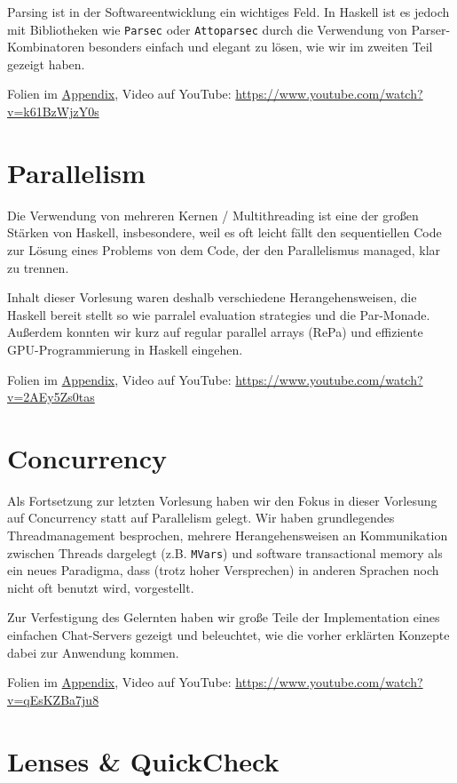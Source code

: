 \documentclass[10pt,a4paper]{article}
\begin{document}
Parsing ist in der Softwareentwicklung ein wichtiges Feld. In Haskell ist es jedoch mit Bibliotheken wie \texttt{Parsec} oder \texttt{Attoparsec} durch die Verwendung von Parser-Kombinatoren besonders einfach und elegant zu lösen, wie wir im zweiten Teil gezeigt haben. 

\smallskip\smallskip
Folien im \hyperref[v4]{Appendix}, Video auf YouTube: \;\url{https://www.youtube.com/watch?v=k61BzWjzY0s}

\section{Parallelism}

Die Verwendung von mehreren Kernen / Multithreading ist eine der großen Stärken von Haskell, insbesondere, weil es oft leicht fällt den sequentiellen Code zur Lösung eines Problems von dem Code, der den Parallelismus managed, klar zu trennen.

Inhalt dieser Vorlesung waren deshalb verschiedene Herangehensweisen, die Haskell bereit stellt so wie parralel evaluation strategies und die Par-Monade. Außerdem konnten wir kurz auf regular parallel arrays (RePa) und effiziente GPU-Programmierung in Haskell eingehen.

\smallskip\smallskip
Folien im \hyperref[v5]{Appendix}, Video auf YouTube: \;\url{https://www.youtube.com/watch?v=2AEy5Zs0tas}

\section{Concurrency}

Als Fortsetzung zur letzten Vorlesung haben wir den Fokus in dieser Vorlesung auf Concurrency statt auf Parallelism gelegt. Wir haben grundlegendes Threadmanagement besprochen, mehrere Herangehensweisen an Kommunikation zwischen Threads dargelegt (z.B. \texttt{MVars}) und software transactional memory als ein neues Paradigma, dass (trotz hoher Versprechen) in anderen Sprachen noch nicht oft benutzt wird, vorgestellt.
\smallskip\smallskip

Zur Verfestigung des Gelernten haben wir große Teile der Implementation eines einfachen Chat-Servers gezeigt und beleuchtet, wie die vorher erklärten Konzepte dabei zur Anwendung kommen.

\smallskip\smallskip
Folien im \hyperref[v6]{Appendix}, Video auf YouTube: \;\url{https://www.youtube.com/watch?v=qEsKZBa7ju8}

\section{Lenses \& QuickCheck}
\end{document}

